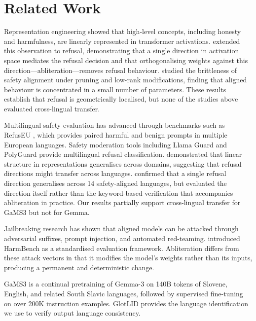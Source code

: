 \documentclass[11pt,letterpaper]{article}
\begin{document}
\section{Related Work}

Representation engineering \citep{Zou2023} showed that high-level concepts, including honesty and harmfulness, are linearly represented in transformer activations. \citet{Arditi2024} extended this observation to refusal, demonstrating that a single direction in activation space mediates the refusal decision and that orthogonalising weights against this direction---abliteration---removes refusal behaviour. \citet{Wei2024} studied the brittleness of safety alignment under pruning and low-rank modifications, finding that aligned behaviour is concentrated in a small number of parameters. These results establish that refusal is geometrically localised, but none of the studies above evaluated cross-lingual transfer.

Multilingual safety evaluation has advanced through benchmarks such as RefusEU \citep{Krasnodebska2026}, which provides paired harmful and benign prompts in multiple European languages. Safety moderation tools including Llama Guard \citep{Inan2023} and PolyGuard \citep{Kumar2025} provide multilingual refusal classification. \citet{Marks2023} demonstrated that linear structure in representations generalises across domains, suggesting that refusal directions might transfer across languages. \citet{Wang2025} confirmed that a single refusal direction generalises across 14 safety-aligned languages, but evaluated the direction itself rather than the keyword-based verification that accompanies abliteration in practice. Our results partially support cross-lingual transfer for GaMS3 but not for Gemma.

Jailbreaking research \citep{Zou2023a, Shen2023, Mehrotra2023} has shown that aligned models can be attacked through adversarial suffixes, prompt injection, and automated red-teaming. \citet{Mazeika2024} introduced HarmBench as a standardised evaluation framework. Abliteration differs from these attack vectors in that it modifies the model's weights rather than its inputs, producing a permanent and deterministic change.

GaMS3 \citep{Vres2026} is a continual pretraining of Gemma-3 on 140B tokens of Slovene, English, and related South Slavic languages, followed by supervised fine-tuning on over 200K instruction examples. GlotLID \citep{Kargaran2023} provides the language identification we use to verify output language consistency.
\end{document}
